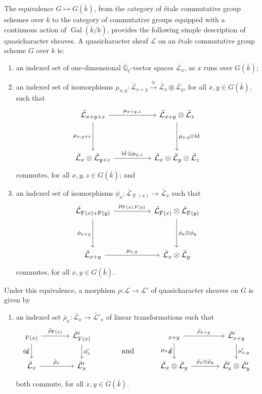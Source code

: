 \documentclass[CM,Submssn,SecEq]{degruyter-crelle} %
\makeatletter
\theoremstyle{plain}
\theoremstyle{definition}
\theoremstyle{remark}
\newcommand{\EE}{\mathbb{\bar Q}_\ell}
\newcommand{\bFq}{\bar{k}}
\newcommand{\Fq}{k}
\DeclareMathOperator{\Gal}{Gal}
\newcommand{\Frob}[1]{\operatorname{F}_{#1}}
\DeclareMathOperator{\id}{id}
\newcommand{\iso}{{\ \cong\ }}
\newcommand{\qcs}[1]{{\mathcal{#1}}}
\newcommand{\gqcs}[1]{{\mathcal{\bar #1}}}
\newcommand{\labitem}[2]{
\def\@itemlabel{\textbf{#1}}
\item
\def\@currentlabel{#1}\label{#2}}
\newcommand{\brho}{{\bar\rho}}
\newcommand{\tight}[3]{\hspace{-#1pt}{#2}\hspace{-#3pt}}
\makeatother
\begin{document}
The equivalence $G \mapsto G(\bFq)$,
from the category of \'etale commutative group schemes over $\Fq$ to the category of commutative groups equipped
with a continuous action of $\Gal(\bFq/\Fq)$,
provides the following simple description of quasicharacter sheaves.
%
A quasicharacter sheaf $\qcs{L}$ on an \'etale commutative group scheme $G$ over $\Fq$ is:
\begin{enumerate}
 \labitem{(qc.1)}{qc.1} an indexed set of one-dimensional
  $\EE$-vector spaces $\gqcs{L}_x$, as $x$ runs over
  $G(\bFq)$;

 \labitem{(qc.2)}{qc.2} an indexed set of isomorphisms
  $\mu_{x,y} : \gqcs{L}_{x+y} \xrightarrow{\iso} \gqcs{L}_{x} \otimes\gqcs{L}_{y}$,
  for all $x,y \in G(\bFq)$, such that
  \[
   \begin{tikzcd}[row sep=40]
    \gqcs{L}_{x+y+z} \arrow{rr}{\mu_{x+y,z}} \arrow[swap]{d}{\mu_{x,y+z}}
    && \gqcs{L}_{x+y}\otimes\gqcs{L}_{z} \dar{\mu_{x,y} \tight{0.5}{\otimes}{1} \id} \\
    \gqcs{L}_{x} \otimes\gqcs{L}_{y+z} \arrow{rr}{\id \otimes\mu_{y,z}}
    && \gqcs{L}_{x} \otimes\gqcs{L}_{y} \otimes\gqcs{L}_{z}
   \end{tikzcd}
  \]
  commutes, for all $x,y,z\in G(\bFq)$; and
 \labitem{(qc.3)}{qc.3} an indexed set of isomorphisms $\phi_{x} : \gqcs{L}_{\Frob{}(x)} \to \gqcs{L}_x$
  such that
  \[
   \begin{tikzcd}[row sep=40]
    \gqcs{L}_{\Frob{}(x)+\Frob{}(y)} \arrow[swap]{d}{\phi_{x+y}} \arrow{rr}{\mu_{\Frob{}(x),\Frob{}(y)}}
    && \gqcs{L}_{\Frob{}(x)}\otimes\gqcs{L}_{\Frob{}(y)} \dar{\phi_x \tight{0}{\otimes}{0} \phi_y} \\
    \gqcs{L}_{x+y} \arrow{rr}{\mu_{x,y}}
    && \gqcs{L}_x \otimes\gqcs{L}_y
   \end{tikzcd}
  \]
  commutes, for all $x,y\in G(\bFq)$.
\end{enumerate}
Under this equivalence, a morphism $\rho : \qcs{L} \to \qcs{L'}$ of quasicharacter sheaves on $G$ is given by
\begin{enumerate}
 \labitem{(qc.4)}{qc.4} an indexed set $\brho_x : \gqcs{L}_x \to \gqcs{L'}_x$
  of linear transformations such that
  \[
   \begin{tikzcd}[column sep=40]
    \arrow[swap]{d}{\phi_x} \gqcs{L}_{\Frob{}(x)} \rar{\brho_{\Frob{}(x)}} & \gqcs{L'}_{\Frob{}(x)} \dar{\phi_x'}
    &\arrow[draw=none]{d}[pos=.4,description]{\text{\normalsize{and}}}
    & \arrow[swap]{d}{\mu_{x,y}} \gqcs{L}_{x+y} \rar{\brho_{x+y}} & \gqcs{L'}_{x+y} \dar{\mu'_{x,y}} \\
    \gqcs{L}_x \rar{\brho_x} & \gqcs{L'}_x
    & {} & \gqcs{L}_x\otimes\gqcs{L}_y \rar{\brho_x\otimes\brho_y} & \gqcs{L'}_x \otimes\gqcs{L'}_y
   \end{tikzcd}
  \]
  both commute, for all $x, y \in G(\bFq)$.
\end{enumerate}
\end{document}
